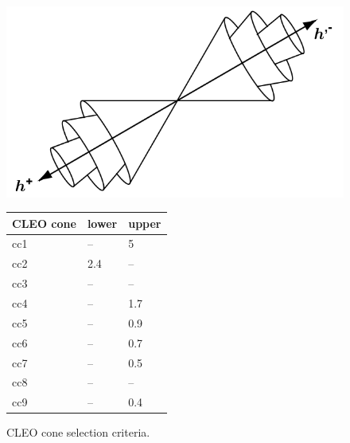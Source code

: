 \documentclass[12pt]{thesis}  %
\begin{document}
\begin{figure}[h]
\centering
\begin{minipage}{.475\textwidth}
  \centering
	\includegraphics[width=\linewidth]{images/cleo-cone.png}
	\caption[]%
	{{\small Illustration of CLEO cones.}}
	\label{fig:cleo cone image}
\end{minipage}%
\hfill
\begin{minipage}{.475\textwidth}
\centering
\begin{tabular}{lll}
\textbf{CLEO cone} & \multicolumn{1}{c}{\textbf{lower}} & \multicolumn{1}{c}{\textbf{upper}} \\ \hline
cc1 & -- & \num{5} \\
cc2 & \num{2.4} & -- \\
cc3 & -- & -- \\
cc4 & -- & \num{1.7} \\
cc5 & -- & \num{0.9} \\
cc6 & -- & \num{0.7} \\
cc7 & -- & \num{0.5} \\
cc8 & -- & -- \\
cc9 & -- & \num{0.4}
\end{tabular}
\caption[]%
{{\small CLEO cone selection criteria.}}
\label{tab:cleo cone cuts}
\end{minipage}
\end{figure}
\end{document}
